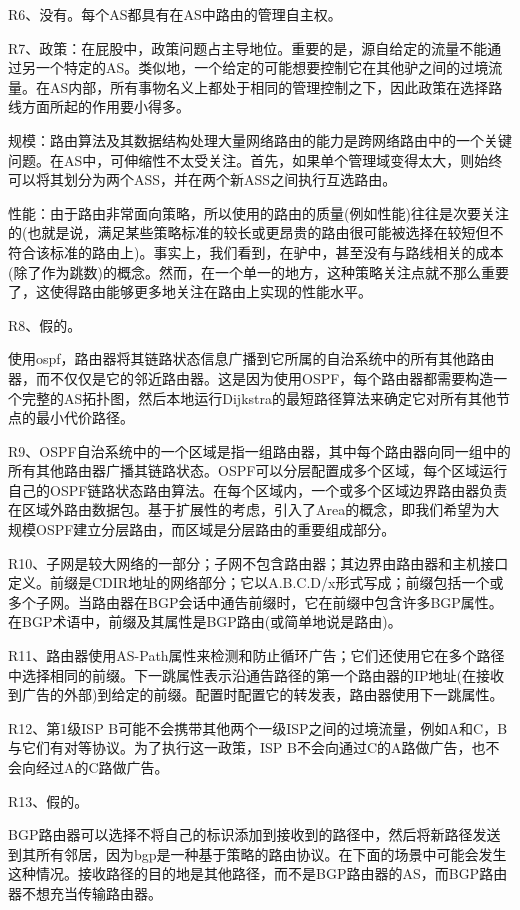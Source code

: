 \documentclass[11pt,UTF8,twoside]{article}
\begin{document}
	R6、没有。每个AS都具有在AS中路由的管理自主权。
	
	R7、政策：在屁股中，政策问题占主导地位。重要的是，源自给定的流量不能通过另一个特定的AS。类似地，一个给定的可能想要控制它在其他驴之间的过境流量。在AS内部，所有事物名义上都处于相同的管理控制之下，因此政策在选择路线方面所起的作用要小得多。
	
	规模：路由算法及其数据结构处理大量网络路由的能力是跨网络路由中的一个关键问题。在AS中，可伸缩性不太受关注。首先，如果单个管理域变得太大，则始终可以将其划分为两个ASS，并在两个新ASS之间执行互选路由。
	
	性能：由于路由非常面向策略，所以使用的路由的质量(例如性能)往往是次要关注的(也就是说，满足某些策略标准的较长或更昂贵的路由很可能被选择在较短但不符合该标准的路由上)。事实上，我们看到，在驴中，甚至没有与路线相关的成本(除了作为跳数)的概念。然而，在一个单一的地方，这种策略关注点就不那么重要了，这使得路由能够更多地关注在路由上实现的性能水平。
	
	R8、假的。
	
	使用ospf，路由器将其链路状态信息广播到它所属的自治系统中的所有其他路由器，而不仅仅是它的邻近路由器。这是因为使用OSPF，每个路由器都需要构造一个完整的AS拓扑图，然后本地运行Dijkstra的最短路径算法来确定它对所有其他节点的最小代价路径。
	
	R9、OSPF自治系统中的一个区域是指一组路由器，其中每个路由器向同一组中的所有其他路由器广播其链路状态。OSPF可以分层配置成多个区域，每个区域运行自己的OSPF链路状态路由算法。在每个区域内，一个或多个区域边界路由器负责在区域外路由数据包。基于扩展性的考虑，引入了Area的概念，即我们希望为大规模OSPF建立分层路由，而区域是分层路由的重要组成部分。
	
	R10、子网是较大网络的一部分；子网不包含路由器；其边界由路由器和主机接口定义。前缀是CDIR地址的网络部分；它以A.B.C.D/x形式写成；前缀包括一个或多个子网。当路由器在BGP会话中通告前缀时，它在前缀中包含许多BGP属性。在BGP术语中，前缀及其属性是BGP路由(或简单地说是路由)。
	
	R11、路由器使用AS-Path属性来检测和防止循环广告；它们还使用它在多个路径中选择相同的前缀。下一跳属性表示沿通告路径的第一个路由器的IP地址(在接收到广告的外部)到给定的前缀。配置时配置它的转发表，路由器使用下一跳属性。
	
	R12、第1级ISP B可能不会携带其他两个一级ISP之间的过境流量，例如A和C，B与它们有对等协议。为了执行这一政策，ISP B不会向通过C的A路做广告，也不会向经过A的C路做广告。
	
	R13、假的。
	
	BGP路由器可以选择不将自己的标识添加到接收到的路径中，然后将新路径发送到其所有邻居，因为bgp是一种基于策略的路由协议。在下面的场景中可能会发生这种情况。接收路径的目的地是其他路径，而不是BGP路由器的AS，而BGP路由器不想充当传输路由器。
	
\end{document}
